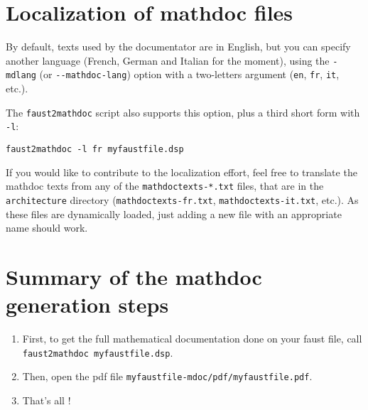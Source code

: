 \section{Localization of mathdoc files}
\label{sec:localization-mdoc}

By default, texts used by the documentator are in English, but you can specify another language (French, German and Italian for the moment), using the \lstinline!-mdlang! (or \lstinline!--mathdoc-lang!) option with a two-letters argument (\lstinline!en!, \lstinline!fr!, \lstinline!it!, etc.).

The \lstinline!faust2mathdoc! script also supports this option, plus a third short form with \lstinline!-l!:
\begin{lstlisting}
faust2mathdoc -l fr myfaustfile.dsp
\end{lstlisting}

If you would like to contribute to the localization effort, feel free to translate the mathdoc texts from any of the \lstinline!mathdoctexts-*.txt! files, that are in the \lstinline!architecture! directory (\lstinline!mathdoctexts-fr.txt!, \lstinline!mathdoctexts-it.txt!, etc.). As these files are dynamically loaded, just adding a new file with an appropriate name should work.




\section{Summary of the mathdoc generation steps}
\label{sec:mdoc-summary}

\begin{enumerate}
\item First, to get the full mathematical documentation done on your faust file, call \lstinline!faust2mathdoc myfaustfile.dsp!.
\item Then, open the pdf file \lstinline!myfaustfile-mdoc/pdf/myfaustfile.pdf!.
\item That's all !
\end{enumerate}



